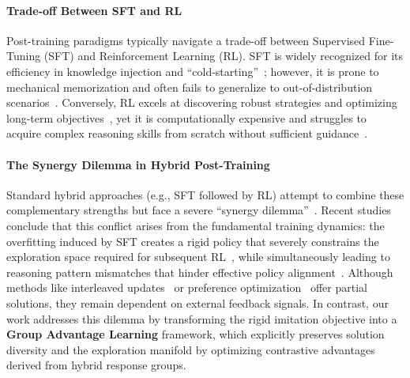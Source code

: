 \paragraph{Trade-off Between SFT and RL}
Post-training paradigms typically navigate a trade-off between Supervised Fine-Tuning (SFT) and Reinforcement Learning (RL). SFT is widely recognized for its efficiency in knowledge injection and ``cold-starting''~\citep{zhou2023lima, chung2024scaling}; however, it is prone to mechanical memorization and often fails to generalize to out-of-distribution scenarios~\citep{ouyang2022training, bai2022training, chu2025sft, swamy2025all, huan2025does}. Conversely, RL excels at discovering robust strategies and optimizing long-term objectives~\citep{christiano2017deep}, yet it is computationally expensive and struggles to acquire complex reasoning skills from scratch without sufficient guidance~\citep{schulman2017proximal, sheng2025hybridflow, mandlekar2021matters, chen2025empirical}.

\paragraph{The Synergy Dilemma in Hybrid Post-Training}
Standard hybrid approaches (e.g., SFT followed by RL) attempt to combine these complementary strengths but face a severe ``synergy dilemma''~\citep{ouyang2022training, rafailov2023direct}. Recent studies conclude that this conflict arises from the fundamental training dynamics: the overfitting induced by SFT creates a rigid policy that severely constrains the exploration space required for subsequent RL~\citep{chen2025sft}, while simultaneously leading to reasoning pattern mismatches that hinder effective policy alignment~\citep{chen2025synergy}. Although methods like interleaved updates~\citep{liu2025uft} or preference optimization~\citep{rafailov2023direct} offer partial solutions, they remain dependent on external feedback signals. In contrast, our work addresses this dilemma by transforming the rigid imitation objective into a \textbf{Group Advantage Learning} framework, which explicitly preserves solution diversity and the exploration manifold by optimizing contrastive advantages derived from hybrid response groups.

